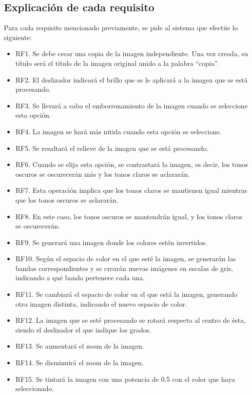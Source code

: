 \documentclass[11pt,a4paper]{article}
\begin{document}
\subsection{Explicación de cada requisito}

Para cada requisito mencionado previamente, se pide al sistema que efectúe lo siguiente:

\begin{itemize}
	\item RF1. Se debe crear una copia de la imagen independiente. Una vez creada, su título será el título de la imagen original unido a la palabra ``copia''.
	\item RF2. El deslizador indicará el brillo que se le aplicará a la imagen que se está procesando.
	\item RF3. Se llevará a cabo el emborronamiento de la imagen cuando se seleccione esta opción.
	\item RF4. La imagen se hará más nitida cuando esta opción se seleccione.
	\item RF5. Se resaltará el relieve de la imagen que se está procesando.
	\item RF6. Cuando se elija esta opción, se contrastará la imagen, es decir, los tonos oscuros se oscurecerán más y los tonos claros se aclararán.
	\item RF7. Esta operación implica que los tonos claros se mantienen igual mientras que los tonos oscuros se aclararán.
	\item RF8. En este caso, los tonos oscuros se mantendrán igual, y los tonos claros se oscurecerán.
	\item RF9. Se generará una imagen donde los colores estén invertidos.
	\item RF10. Según el espacio de color en el que esté la imagen, se generarán las bandas correspondientes y se crearán nuevas imágenes en escalas de gris, indicando a qué banda pertenece cada una.
	\item RF11. Se cambiará el espacio de color en el que está la imagen, generando otra imagen distinta, indicando el nuevo espacio de color.
	\item RF12. La imagen que se esté procesando se rotará respecto al centro de ésta, siendo el deslizador el que indique los grados.
	\item RF13. Se aumentará el zoom de la imagen.
	\item RF14. Se disminuirá el zoom de la imagen.
	\item RF15. Se tintará la imagen con una potencia de 0.5 con el color que haya seleccionado.

\end{itemize}
\end{document}
